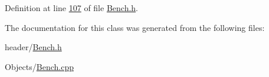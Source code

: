Definition at line \hyperlink{_bench_8h_source_l00107}{107} of file \hyperlink{_bench_8h_source}{Bench.\+h}.



The documentation for this class was generated from the following files\+:\begin{DoxyCompactItemize}
\item 
header/\hyperlink{_bench_8h}{Bench.\+h}\item 
Objects/\hyperlink{_bench_8cpp}{Bench.\+cpp}\end{DoxyCompactItemize}
